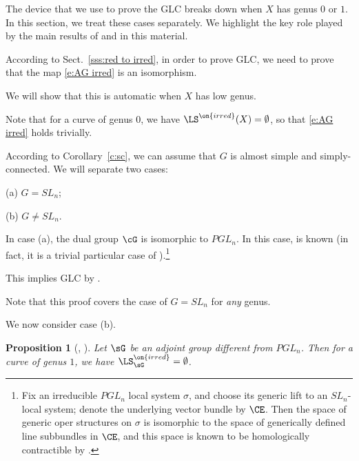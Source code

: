 \documentclass[9pt]{amsart}
\newtheorem{prop}[subsubsection]{Proposition}
\theoremstyle{remark}
\theoremstyle{definition}
\theoremstyle{remark}
\newcommand{\secref}[1]{Sect.~\ref{#1}}
\newcommand{\corref}[1]{Corollary~\ref{#1}}
\numberwithin{equation}{section}
\begin{document}
The device that we use to prove the GLC breaks down when 
$X$ has genus $0$ or $1$.
In this section, we treat these cases separately. 
We highlight the key role played by the main 
results of \cite{GLC3} and \cite{GLC4} in this material. 


According to \secref{sss:red to irred}, in order to prove GLC, we 
need to prove that the map \eqref{e:AG irred}
is an isomorphism.

\medskip

We will show that this is automatic when $X$ has low genus. 


Note that for a curve of genus $0$, we have $\LS^{\on{irred}}(X)=\emptyset$, so that \eqref{e:AG irred} holds trivially.


\sssec{}

According to \corref{c:sc}, we can assume that $G$ is almost simple and simply-connected.
We will separate two cases:

\medskip

\noindent(a) $G=SL_n$;

\medskip

\noindent(b) $G\neq SL_n$. 

\sssec{}

In case (a), the dual group $\cG$ is isomorphic to $PGL_n$. In this case, 
\cite[Conjecture 4.5.7]{GLC4} is known (in fact, it is a trivial particular case of
\cite{BKS}).\footnote{Fix an irreducible $PGL_n$ local system $\sigma$, and choose its generic lift to an $SL_n$-local
system; denote the underlying vector bundle by $\CE$. Then the space of generic oper structures on 
$\sigma$ is isomorphic to the space of generically defined line subbundles in $\CE$, and this
space is known to be homologically contractible by \cite{Ga5}.}

\medskip

This implies GLC by \cite[Corollary 4.5.5]{GLC4}.

\sssec{} \label{sss:g 2}

Note that this proof covers the case of $G=SL_n$ for \emph{any} genus. 

\sssec{}

We now consider case (b). 

\begin{prop}[\cite{KS}, \cite{BFM}] \label{p:genus 1}
Let $\sG$ be an adjoint group different from $PGL_n$. Then for a curve of genus $1$, we have
$\LS_\sG^{\on{irred}}=\emptyset$.
\end{prop} 
\end{document}
